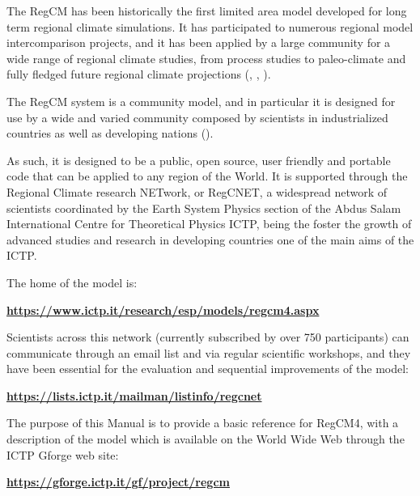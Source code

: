 The \ac{RegCM} has been historically the first limited area model
developed for long term regional climate simulations. It has participated to
numerous regional model intercomparison projects, and it has been applied by
a large community for a wide range of regional climate studies, from process
studies to paleo-climate and fully fledged future regional climate
projections (\cite{Giorgi_99}, \cite{Giorgi_06}, \cite{Giorgi_14}).

The \ac{RegCM} system is a community model, and in particular it is designed
for use by a wide and varied community composed by scientists in industrialized
countries as well as developing nations (\cite{Pal_07}).

As such, it is designed to be a public, open source, user friendly and portable
code that can be applied to any region of the World. It is supported through
the Regional Climate research NETwork, or RegCNET, a widespread network of
scientists coordinated by the Earth System Physics section of
the Abdus Salam International Centre for Theoretical Physics \ac{ICTP},
being the foster the growth of advanced studies and research in developing
countries one of the main aims of the \ac{ICTP}.

The home of the model is:

\begin{center}
	{\bf \url{https://www.ictp.it/research/esp/models/regcm4.aspx}}
\end{center}

Scientists across this network (currently subscribed by over 750 participants)
can communicate through an email list and via regular scientific workshops,
and they have been essential for the evaluation and sequential improvements of
the model:

\begin{center}
	{\bf \url{https://lists.ictp.it/mailman/listinfo/regcnet}}
\end{center}

The purpose of this Manual is to provide a basic reference for \ac{RegCM}4, with
a description of the model which is available on the World Wide Web through
the ICTP Gforge web site:

\begin{center}
	{\bf \url{https://gforge.ictp.it/gf/project/regcm}}
\end{center}

\vfill


